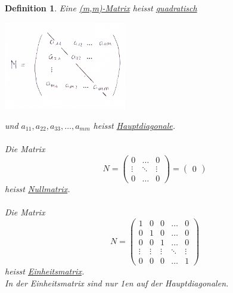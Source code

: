 \documentclass[a4paper,10pt]{report}
\newtheorem{mydef}{Definition}
\begin{document}
\begin{mydef}
	Eine \underline{(m,m)-Matrix} heisst \underline{quadratisch}\\
	\begin{center}
	 	\includegraphics[width=0.4\textwidth]{imgs/mmMatrix.png}
	\end{center}
	und $a_{11}, a_{22}, a_{33}, \ldots, a_{mm}$ heisst \underline{Hauptdiagonale}.\\
	\\
	Die Matrix
	\begin{equation*}
		N = \begin{pmatrix}0  & \ldots & 0 \\ \vdots & \ddots & \vdots \\ 0 & \ldots & 0\end{pmatrix} =  \begin{pmatrix}0\end{pmatrix} 
	\end{equation*}
	heisst \underline{Nullmatrix}.\\
	\\
	Die Matrix
	\begin{equation*}
		N = \begin{pmatrix}1 & 0 & 0 & \ldots & 0 \\ 0 & 1 & 0 &\dots &0  \\ 0 & 0 & 1 & \ldots & 0\\ \vdots&\vdots&\vdots&\ddots& \vdots \\ 0 & 0 & 0 & \ldots & 1\end{pmatrix} 
	\end{equation*}
	heisst \underline{Einheitsmatrix}.\\
	In der Einheitsmatrix sind nur 1en auf der Hauptdiagonalen.
\end{mydef}
\newpage
\end{document}
